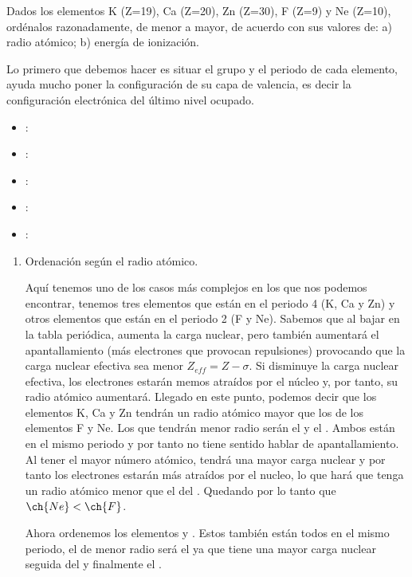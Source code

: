\begin{example}
    Dados los elementos K (Z=19), Ca (Z=20), Zn (Z=30), F (Z=9) y Ne (Z=10), ordénalos razonadamente, de menor a mayor, de acuerdo con sus valores de: a) radio atómico; b) energía de ionización.

        {}

    Lo primero que debemos hacer es situar el grupo y el periodo de cada elemento, ayuda mucho poner la configuración de su capa de valencia, es decir la configuración electrónica del último nivel ocupado.
    \begin{itemize}
        \item {}: 
        \item {}: 
        \item {}: 
        \item {}: 
        \item {}: 
    \end{itemize}

    \begin{enumerate}[label=\letraminuscula]
            \item Ordenación según el radio atómico.

            Aquí tenemos uno de los casos más complejos en los que nos podemos encontrar, tenemos tres elementos que están en el periodo 4 (K, Ca y Zn) y otros elementos que están en el periodo 2 (F y Ne).
            Sabemos que al bajar en la tabla periódica, aumenta la carga nuclear, pero también aumentará el apantallamiento (más electrones que provocan repulsiones) provocando que la carga nuclear efectiva sea menor \( Z_{eff} =  Z - \sigma \).
            Si disminuye la carga nuclear efectiva, los electrones estarán memos atraídos por el núcleo y, por tanto, su radio atómico aumentará.
            Llegado en este punto, podemos decir que los elementos K, Ca y Zn tendrán un radio atómico mayor que los de los elementos F y Ne.
            Los que tendrán menor radio serán el  y el .
            Ambos están en el mismo periodo y por tanto no tiene sentido hablar de apantallamiento.
            Al tener el  mayor número atómico, tendrá una mayor carga nuclear y por tanto los electrones estarán más atraídos por el nucleo, lo que hará que tenga un radio atómico menor que el del .
            Quedando por lo tanto que \( \ch{Ne} < \ch{F}  \).

            Ahora ordenemos los elementos   y .
            Estos también están todos en el mismo periodo, el de menor radio será el  ya que tiene una mayor carga nuclear seguida del  y finalmente el .


\end{enumerate}
\end{example}
